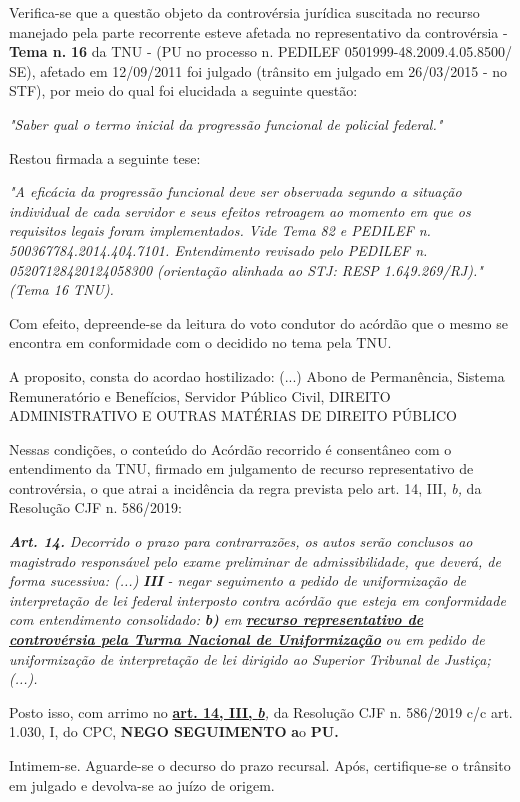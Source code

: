 \documentclass[12pt]{article}
\begin{document}
\justifying
\noindent Verifica-se que a questão objeto da controvérsia jurídica suscitada no recurso manejado pela parte recorrente esteve afetada no representativo da controvérsia - \textbf{Tema n. }\textbf{16} da TNU - (PU no processo n. PEDILEF 0501999-48.2009.4.05.8500/ SE),  afetado em 12/09/2011 foi julgado (trânsito em julgado em 26/03/2015 - no STF), por meio do qual foi elucidada a seguinte questão:

\noindent \textit{"Saber qual o termo inicial da progressão funcional de policial federal."}

\noindent Restou firmada a seguinte tese:

\noindent \textit{"A eficácia da progressão funcional deve ser observada segundo a situação individual de cada servidor e seus efeitos retroagem ao momento em que os requisitos legais foram implementados. Vide Tema 82 e PEDILEF n. 500367784.2014.404.7101. Entendimento revisado pelo PEDILEF n. 05207128420124058300 (orientação alinhada ao STJ: RESP 1.649.269/RJ)." (Tema 16 TNU).}

\noindent Com efeito, depreende-se da leitura do voto condutor do acórdão que o mesmo se encontra em conformidade com o decidido no  tema pela TNU.

\noindent A proposito, consta do acordao hostilizado: (...) Abono de Permanência, Sistema Remuneratório e Benefícios, Servidor Público Civil, DIREITO ADMINISTRATIVO E OUTRAS MATÉRIAS DE DIREITO PÚBLICO

\noindent Nessas condições, o conteúdo do Acórdão recorrido é consentâneo com o entendimento da TNU, firmado em julgamento de recurso representativo de controvérsia, o que atrai a incidência da regra prevista pelo art. 14, III, \textit{b,} da Resolução CJF n. 586/2019:

\noindent \textit{\textbf{Art. 14.}}\textit{ Decorrido o prazo para contrarrazões, os autos serão conclusos ao magistrado responsável pelo exame preliminar de admissibilidade, que deverá, de forma sucessiva: (...) }\textit{\textbf{III }}\textit{- negar seguimento a pedido de uniformização de interpretação de lei federal interposto contra acórdão que esteja em conformidade com entendimento consolidado: }\textit{\textbf{b)}}\textit{ em }\uline{\textit{\textbf{recurso representativo de controvérsia pela Turma Nacional de Uniformização}}}\textit{ ou em pedido de uniformização de interpretação de lei dirigido ao Superior Tribunal de Justiça;(...).}

\noindent Posto isso, com arrimo no \uline{\textbf{art. 14, III, }}\uline{\textit{\textbf{b}}}\textit{,} da Resolução CJF n. 586/2019 c/c art. 1.030, I, do CPC, \textbf{NEGO SEGUIMENTO }\textbf{a}o\textbf{ PU}\textbf{.}

\noindent Intimem-se. Aguarde-se o decurso do prazo recursal. Após, certifique-se o trânsito em julgado e devolva-se ao juízo de origem.
\end{document}
